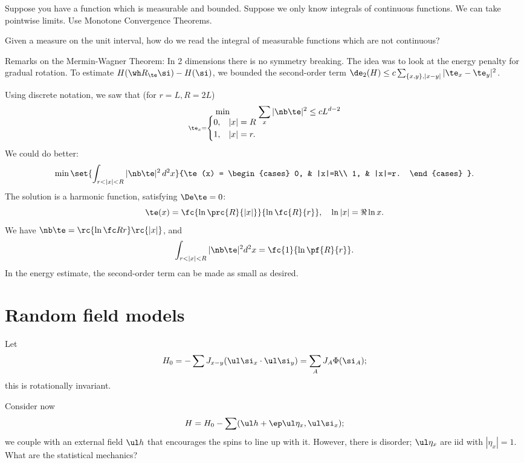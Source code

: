 

Suppose you have a function which is measurable and bounded. Suppose we only know integrals of continuous functions. We can take pointwise limits. Use Monotone Convergence Theorems.

Given a measure on the unit interval, how do we read the integral of measurable functions which are not continuous?


Remarks on the Mermin-Wagner Theorem: In 2 dimensions there is no symmetry breaking. 
The idea was to look at the energy penalty for gradual rotation. 
To estimate $H(\wh R_\te\si) - H(\si)$, we bounded the second-order term $\de_2(H)\le c\sum_{\{x,y\}, |x-y|} |\te_x-\te_y|^2$.

Using discrete notation, we saw that (for $r=L, R=2L$)
\[
\min_{\te_x = \begin{cases}
0,&|x|=R\\
1,&|x|=r.
\end{cases}} \sum_x|\nb \te|^2\le cL^{d-2}
\]
We could do better:
\[
\min
\set{\int_{r<|x|<R} |\nb \te|^2 \,d^2x }{\te(x) = \begin{cases}
0, & |x|=R\\
1, & |x|=r.
\end{cases}
}.
\]
The solution is a harmonic function, satisfying $\De \te=0$:
\[
\te(x) = \fc{\ln \prc{R}{|x|}}{\ln \fc{R}{r}},\quad \ln |x| = \Re \ln x.
\]
We have $\nb \te =\rc{\ln \fc Rr} \rc{|x|}$, and
\[
\int_{r<|x|<R} |\nb \te|^2 d^2x = \fc{1}{\ln \pf{R}{r}}.
\]
In the energy estimate, the second-order term can be made as small as desired.

\section{Random field models}

Let 
\[
H_0=-\sum J_{x-y} (\ul \si_x \cdot \ul \si_y) = \sum_A J_A \Phi(\si_A);
\]
this is rotationally invariant.

Consider now
\[
H = H_0 - \sum (\ul h + \ep \ul\eta_x , \ul \si_x);
\]
we couple with an external field $\ul h$ that encourages the spins to line up with it. However, there is disorder; $\ul\eta_x$ are iid with $|\eta_x|=1$. What are the statistical mechanics?

